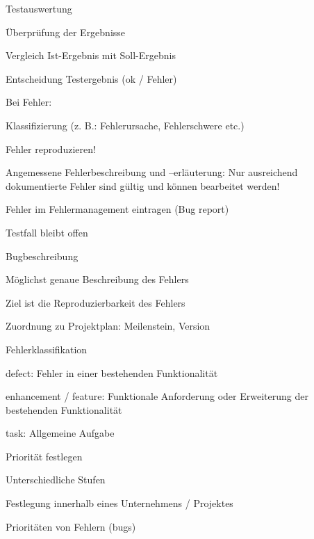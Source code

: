 \documentclass[a4paper]{article}
\begin{document}
\begin{multicols}{3}
  Testauswertung
  \begin{itemize*}
    \item Überprüfung der Ergebnisse
    \item Vergleich Ist-Ergebnis mit Soll-Ergebnis
    \item Entscheidung Testergebnis (ok / Fehler)
    \item Bei Fehler:
    \begin{itemize*}
      \item Klassifizierung (z. B.: Fehlerursache, Fehlerschwere etc.)
      \item Fehler reproduzieren!
      \item Angemessene Fehlerbeschreibung und –erläuterung: Nur ausreichend dokumentierte Fehler sind gültig und können bearbeitet werden!
      \item Fehler im Fehlermanagement eintragen (Bug report)
      \item Testfall bleibt offen
    \end{itemize*}
  \end{itemize*}

  Bugbeschreibung
  \begin{itemize*}
    \item Möglichst genaue Beschreibung des Fehlers
    \item Ziel ist die Reproduzierbarkeit des Fehlers
    \item Zuordnung zu Projektplan: Meilenstein, Version
    \item Fehlerklassifikation
    \begin{itemize*}
      \item defect: Fehler in einer bestehenden Funktionalität
      \item enhancement / feature: Funktionale Anforderung oder Erweiterung der bestehenden Funktionalität
      \item task: Allgemeine Aufgabe
    \end{itemize*}
    \item Priorität festlegen
    \begin{itemize*}
      \item Unterschiedliche Stufen
      \item Festlegung innerhalb eines Unternehmens / Projektes
    \end{itemize*}
    \item Prioritäten von Fehlern (bugs)
  \end{itemize*}


\end{multicols}
\end{document}

